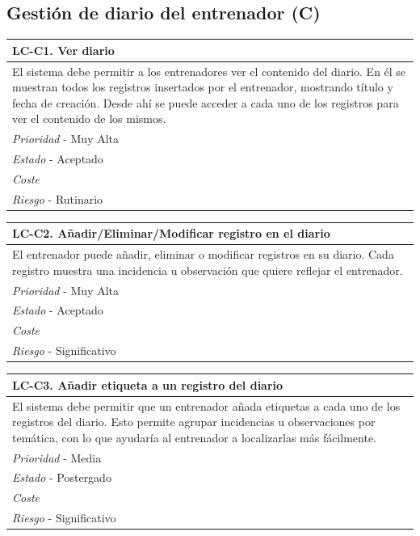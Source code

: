 %
%
\subsection{Gestión de diario del entrenador (C)} %
	\label{sub:gestion_diario_entrenador}

	\begin{center}
		\begin{tabularx}{15cm}{|X|}
			\hline 
				\bf{LC-C1. Ver diario}\\
			\hline
				El sistema debe permitir a los entrenadores ver el contenido del diario. En él se muestran todos los registros insertados por el entrenador, mostrando título y fecha de creación. Desde ahí se puede acceder a cada uno de los registros para ver el contenido de los mismos.\\
			\hline
				{\it Prioridad} - Muy Alta\\
			\hline
				{\it Estado} - Aceptado\\
			\hline
				{\it Coste}\\
			\hline
				{\it Riesgo} - Rutinario\\
			\hline
		\end{tabularx}
	\end{center}
	
	\begin{center}
		\begin{tabularx}{15cm}{|X|}
			\hline 
				\bf{LC-C2. Añadir/Eliminar/Modificar registro en el diario}\\
			\hline
				El entrenador puede añadir, eliminar o modificar registros en su diario. Cada registro muestra una incidencia u observación que quiere reflejar el entrenador.\\
			\hline
				{\it Prioridad} - Muy Alta\\
			\hline
				{\it Estado} - Aceptado\\
			\hline
				{\it Coste}\\
			\hline
				{\it Riesgo} - Significativo\\
			\hline
		\end{tabularx}
	\end{center}
	
	\begin{center}
		\begin{tabularx}{15cm}{|X|}
			\hline 
				\bf{LC-C3. Añadir etiqueta a un registro del diario}\\
			\hline
				El sistema debe permitir que un entrenador añada etiquetas a cada uno de los registros del diario. Esto permite agrupar incidencias u observaciones por temática, con lo que ayudaría al entrenador a localizarlas más fácilmente.\\
			\hline
				{\it Prioridad} - Media\\
			\hline
				{\it Estado} - Postergado\\
			\hline
				{\it Coste}\\
			\hline
				{\it Riesgo} - Significativo\\
			\hline
		\end{tabularx}
	\end{center}
	
